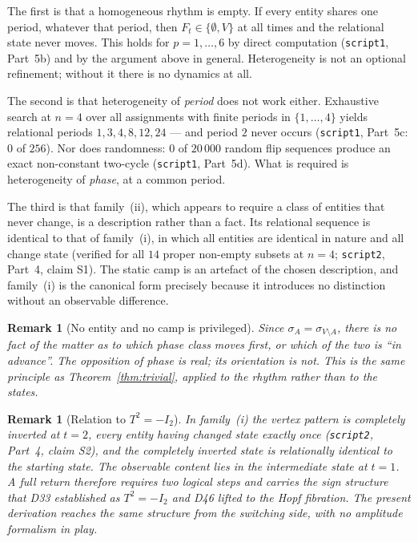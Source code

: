 \documentclass[11pt,a4paper]{article}
\newtheorem{remark}[theorem]{Remark}
\begin{document}
The first is that a homogeneous rhythm is empty. If every entity shares one period, whatever that period, then $F_t\in\{\emptyset,V\}$ at all times and the relational state never moves. This holds for $p=1,\dots,6$ by direct computation (\texttt{script1}, Part~5b) and by the argument above in general. Heterogeneity is not an optional refinement; without it there is no dynamics at all.

The second is that heterogeneity of \emph{period} does not work either. Exhaustive search at $n=4$ over all assignments with finite periods in $\{1,\dots,4\}$ yields relational periods $1,3,4,8,12,24$ --- and period $2$ never occurs (\texttt{script1}, Part~5c: $0$ of $256$). Nor does randomness: $0$ of $20\,000$ random flip sequences produce an exact non-constant two-cycle (\texttt{script1}, Part~5d). What is required is heterogeneity of \emph{phase}, at a common period.

The third is that family~(ii), which appears to require a class of entities that never change, is a description rather than a fact. Its relational sequence is identical to that of family~(i), in which all entities are identical in nature and all change state (verified for all $14$ proper non-empty subsets at $n=4$; \texttt{script2}, Part~4, claim S1). The static camp is an artefact of the chosen description, and family~(i) is the canonical form precisely because it introduces no distinction without an observable difference.

\begin{remark}[No entity and no camp is privileged]
Since $\sigma_A=\sigma_{V\setminus A}$, there is no fact of the matter as to which phase class moves first, or which of the two is ``in advance''. The opposition of phase is real; its orientation is not. This is the same principle as Theorem~\ref{thm:trivial}, applied to the rhythm rather than to the states.
\end{remark}

\begin{remark}[Relation to $T^2=-I_2$]
\label{rem:T2}
In family~(i) the vertex pattern is completely inverted at $t=2$, every entity having changed state exactly once (\texttt{script2}, Part~4, claim S2), and the completely inverted state is relationally identical to the starting state. The observable content lies in the intermediate state at $t=1$. A full return therefore requires two logical steps and carries the sign structure that D33 established as $T^2=-I_2$ and D46 lifted to the Hopf fibration. The present derivation reaches the same structure from the switching side, with no amplitude formalism in play.
\end{remark}
\end{document}
